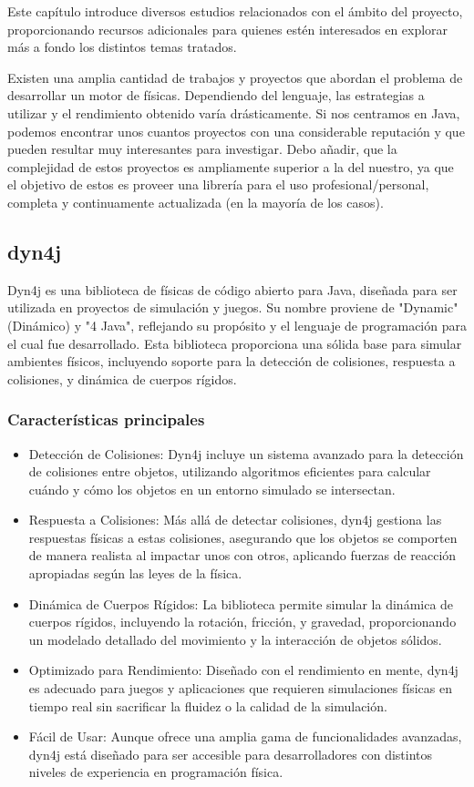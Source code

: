 

Este capítulo introduce diversos estudios relacionados con el ámbito del proyecto, proporcionando recursos adicionales para quienes estén interesados en explorar más a fondo los distintos temas tratados.

Existen una amplia cantidad de trabajos y proyectos que abordan el problema de desarrollar un motor de físicas. Dependiendo del lenguaje, las estrategias a utilizar y el rendimiento obtenido varía drásticamente. Si nos centramos en Java, podemos encontrar unos cuantos proyectos con una considerable reputación y que pueden resultar muy interesantes para investigar. Debo añadir, que la complejidad de estos proyectos es ampliamente superior a la del nuestro, ya que el objetivo de estos es proveer una librería para el uso profesional/personal, completa y continuamente actualizada (en la mayoría de los casos).

\subsection{dyn4j} 
Dyn4j\cite{dyn4j} es una biblioteca de físicas de código abierto para Java, diseñada para ser utilizada en proyectos de simulación y juegos. Su nombre proviene de "Dynamic" (Dinámico) y "4 Java", reflejando su propósito y el lenguaje de programación para el cual fue desarrollado. Esta biblioteca proporciona una sólida base para simular ambientes físicos, incluyendo soporte para la detección de colisiones, respuesta a colisiones, y dinámica de cuerpos rígidos.

\subsubsection{Características principales}
\begin{itemize}
    \item Detección de Colisiones: Dyn4j incluye un sistema avanzado para la detección de colisiones entre objetos, utilizando algoritmos eficientes para calcular cuándo y cómo los objetos en un entorno simulado se intersectan.
    \item Respuesta a Colisiones: Más allá de detectar colisiones, dyn4j gestiona las respuestas físicas a estas colisiones, asegurando que los objetos se comporten de manera realista al impactar unos con otros, aplicando fuerzas de reacción apropiadas según las leyes de la física.
    \item Dinámica de Cuerpos Rígidos: La biblioteca permite simular la dinámica de cuerpos rígidos, incluyendo la rotación, fricción, y gravedad, proporcionando un modelado detallado del movimiento y la interacción de objetos sólidos.
    \item Optimizado para Rendimiento: Diseñado con el rendimiento en mente, dyn4j es adecuado para juegos y aplicaciones que requieren simulaciones físicas en tiempo real sin sacrificar la fluidez o la calidad de la simulación.
    \item Fácil de Usar: Aunque ofrece una amplia gama de funcionalidades avanzadas, dyn4j está diseñado para ser accesible para desarrolladores con distintos niveles de experiencia en programación física.
\end{itemize}
